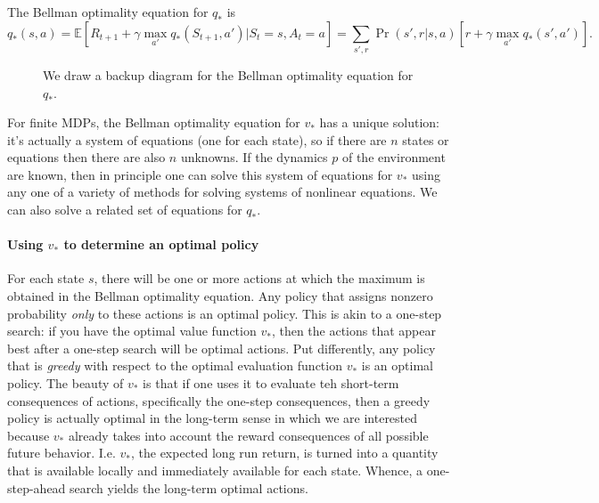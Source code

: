 \documentclass[12pt]{article}
\begin{document}
The Bellman optimality equation for $q_*$ is
\[
  q_*(s,a) = \mathbb E \left[R_{t+1} + \gamma \max_{a'} q_*(S_{t+1}, a') | S_t = s, A_t = a \right] = \sum_{s',r} \Pr(s', r|s,a) \left[r + \gamma \max_{a'} q_*(s', a') \right].
\]
\begin{figure}[h]
  \centering
  \caption{\footnotesize We draw a backup diagram for the Bellman optimality equation for $q_*$.}
\end{figure}
For finite MDPs, the Bellman optimality equation for $v_*$ has a unique solution: it's actually a system of equations (one for each state), so if there are $n$ states or equations then there are also $n$ unknowns. If the dynamics $p$ of the environment are known, then in principle one can solve this system of equations for $v_*$ using any one of a variety of methods for solving systems of nonlinear equations. We can also solve a related set of equations for $q_*$.

\paragraph{Using $v_*$ to determine an optimal policy} For each state $s$, there will be one or more actions at which the maximum is obtained in the Bellman optimality equation. Any policy that assigns nonzero probability \emph{only} to these actions is an optimal policy. This is akin to a one-step search: if you have the optimal value function $v_*$, then the actions that appear best after a one-step search will be optimal actions. Put differently, any policy that is \emph{greedy} with respect to the optimal evaluation function $v_*$ is an optimal policy. The beauty of $v_*$ is that if one uses it to evaluate teh short-term consequences of actions, specifically the one-step consequences, then a greedy policy is actually optimal in the long-term sense in which we are interested because $v_*$ already takes into account the reward consequences of all possible future behavior. I.e. $v_*$, the expected long run return, is turned into a quantity that is available locally and immediately available for each state. Whence, a one-step-ahead search yields the long-term optimal actions.
\end{document}
